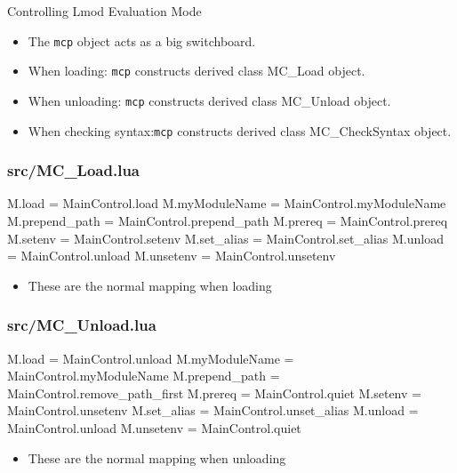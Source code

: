 \documentclass{beamer}
\begin{document}
\begin{frame}{Controlling Lmod Evaluation Mode}
  \begin{itemize}
    \item The \texttt{mcp} object acts as a big switchboard.
    \item When loading: \texttt{mcp} constructs derived class
      MC\_Load object.
    \item When unloading: \texttt{mcp} constructs derived class
      MC\_Unload object.
    \item When checking syntax:\texttt{mcp} constructs derived class
      MC\_CheckSyntax object.
  \end{itemize}
\end{frame}



\begin{frame}[fragile]
    \frametitle{src/MC\_Load.lua}
 {\tiny
    \begin{semiverbatim}
M.load                 = MainControl.load
M.myModuleName         = MainControl.myModuleName
M.prepend\_path         = MainControl.prepend\_path
M.prereq               = MainControl.prereq
M.setenv               = MainControl.setenv
M.set\_alias            = MainControl.set\_alias
M.unload               = MainControl.unload
M.unsetenv             = MainControl.unsetenv
    \end{semiverbatim}
}
  \begin{itemize}
    \item These are the normal mapping when loading
  \end{itemize}

\end{frame}

\begin{frame}[fragile]
    \frametitle{src/MC\_Unload.lua}
 {\tiny
    \begin{semiverbatim}
M.load                 = MainControl.unload
M.myModuleName         = MainControl.myModuleName
M.prepend\_path         = MainControl.remove\_path\_first
M.prereq               = MainControl.quiet
M.setenv               = MainControl.unsetenv
M.set\_alias            = MainControl.unset\_alias
M.unload               = MainControl.unload
M.unsetenv             = MainControl.quiet
    \end{semiverbatim}
}
  \begin{itemize}
    \item These are the normal mapping when unloading
  \end{itemize}
\end{frame}
\end{document}
